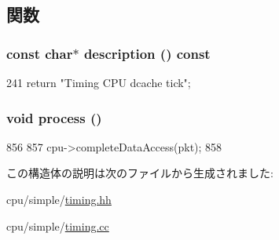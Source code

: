 \subsection{関数}
\hypertarget{structTimingSimpleCPU_1_1DcachePort_1_1DTickEvent_a2bd90422eece9190794479e08092a252}{
\subsubsection[{description}]{\setlength{\rightskip}{0pt plus 5cm}const char$\ast$ description () const}}
\label{structTimingSimpleCPU_1_1DcachePort_1_1DTickEvent_a2bd90422eece9190794479e08092a252}



\begin{DoxyCode}
241 { return "Timing CPU dcache tick"; }
\end{DoxyCode}
\hypertarget{structTimingSimpleCPU_1_1DcachePort_1_1DTickEvent_a2e9c5136d19b1a95fc427e0852deab5c}{
\subsubsection[{process}]{\setlength{\rightskip}{0pt plus 5cm}void process ()}}
\label{structTimingSimpleCPU_1_1DcachePort_1_1DTickEvent_a2e9c5136d19b1a95fc427e0852deab5c}



\begin{DoxyCode}
856 {
857     cpu->completeDataAccess(pkt);
858 }
\end{DoxyCode}


この構造体の説明は次のファイルから生成されました:\begin{DoxyCompactItemize}
\item 
cpu/simple/\hyperlink{timing_8hh}{timing.hh}\item 
cpu/simple/\hyperlink{timing_8cc}{timing.cc}\end{DoxyCompactItemize}
